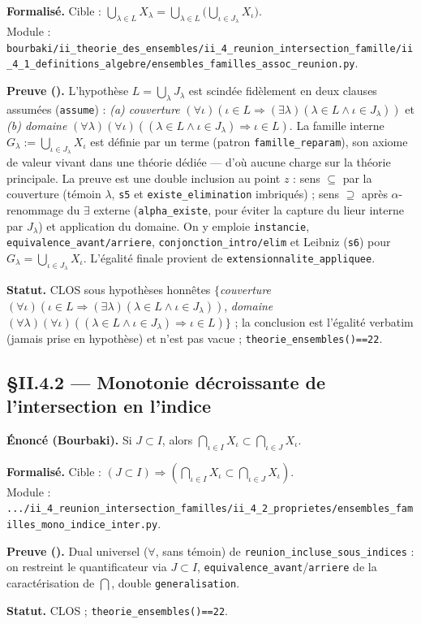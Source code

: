 \textbf{Formalisé.} Cible : $\bigcup_{\lambda\in L} X_\lambda = \bigcup_{\lambda\in L}\bigl(\bigcup_{\iota\in J_\lambda} X_\iota\bigr)$. \\
Module : \texttt{bourbaki/ii\_theorie\_des\_ensembles/ii\_4\_reunion\_intersection\_famille/ii\_4\_1\_definitions\_algebre/ensembles\_familles\_assoc\_reunion.py}.

\textbf{Preuve (\Nstar).} L'hypothèse $L = \bigcup_\lambda J_\lambda$ est scindée fidèlement en deux clauses
assumées (\texttt{assume}) : \emph{(a) couverture} $(\forall\iota)(\iota\in L \Rightarrow (\exists\lambda)
(\lambda\in L \wedge \iota\in J_\lambda))$ et \emph{(b) domaine} $(\forall\lambda)(\forall\iota)((\lambda\in L
\wedge \iota\in J_\lambda) \Rightarrow \iota\in L)$. La famille interne $G_\lambda := \bigcup_{\iota\in J_\lambda}
X_\iota$ est définie par un terme (patron \texttt{famille\_reparam}), son axiome de valeur vivant dans une
théorie dédiée --- d'où aucune charge sur la théorie principale. La preuve est une double inclusion au point
$z$ : sens $\subseteq$ par la couverture (témoin $\lambda$, \texttt{s5} et \texttt{existe\_elimination}
imbriqués) ; sens $\supseteq$ après $\alpha$-renommage du $\exists$ externe (\texttt{alpha\_existe}, pour
éviter la capture du lieur interne par $J_\lambda$) et application du domaine. On y emploie \texttt{instancie},
\texttt{equivalence\_avant/arriere}, \texttt{conjonction\_intro/elim} et Leibniz (\texttt{s6}) pour
$G_\lambda = \bigcup_{\iota\in J_\lambda} X_\iota$. L'égalité finale provient de
\texttt{extensionnalite\_appliquee}.

\textbf{Statut.} CLOS sous hypothèses honnêtes $\{$\emph{couverture}~$(\forall\iota)(\iota\in L \Rightarrow
(\exists\lambda)(\lambda\in L \wedge \iota\in J_\lambda))$, \emph{domaine}~$(\forall\lambda)(\forall\iota)
((\lambda\in L \wedge \iota\in J_\lambda) \Rightarrow \iota\in L)\}$ ; la conclusion est l'égalité verbatim
(jamais prise en hypothèse) et n'est pas vacue ; \texttt{theorie\_ensembles()==22}.


\subsection{§II.4.2 --- Monotonie décroissante de l'intersection en l'indice}
\textbf{Énoncé (Bourbaki).} Si $J\subset I$, alors
$\bigcap_{\iota\in I}X_\iota \subset \bigcap_{\iota\in J}X_\iota$.

\textbf{Formalisé.} Cible : $(J\subset I) \Rightarrow (\bigcap_{\iota\in I}X_\iota \subset \bigcap_{\iota\in J}X_\iota)$. \\
Module : \texttt{.../ii\_4\_reunion\_intersection\_familles/ii\_4\_2\_proprietes/ensembles\_familles\_mono\_indice\_inter.py}.

\textbf{Preuve (\Nstar).} Dual universel ($\forall$, sans témoin) de
\texttt{reunion\_incluse\_sous\_indices} : on restreint le quantificateur via
$J\subset I$, \texttt{equivalence\_avant}/\texttt{arriere} de la caractérisation
de $\bigcap$, double \texttt{generalisation}.

\textbf{Statut.} CLOS ; \texttt{theorie\_ensembles()==22}.
